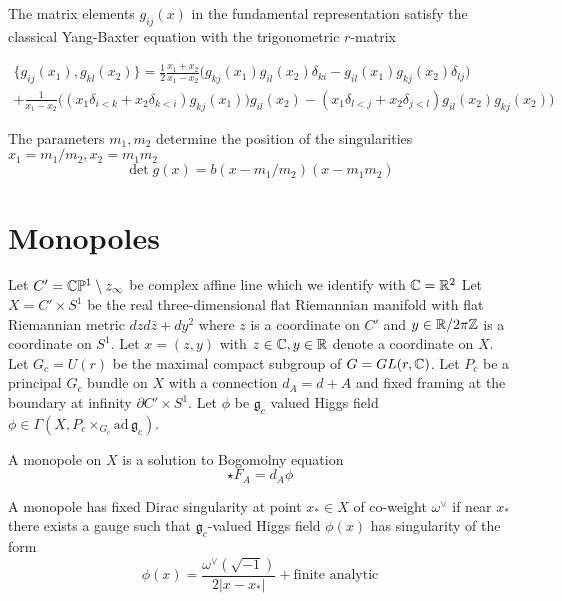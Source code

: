 \documentclass[12pt,psamsfonts,reqno]{amsart}
\begin{document}
The matrix elements $g_{ij}(x)$ in the fundamental representation satisfy the classical Yang-Baxter equation with the trigonometric $r$-matrix

\begin{multline}
  \{  g_{ij}(x_1), g_{kl}(x_2) \} = \frac{1}{2} \frac{ x_1 + x_2}{x_1 - x_2}
  \Big(  g_{kj}(x_1) g_{il}(x_2) \delta_{ki} - g_{il}(x_1) g_{kj}(x_2) \delta_{lj} \Big) \\
  + \frac{1}{x_1 -x_2} 
\Big ( (x_1 \delta_{i<k} + x_2 \delta_{k<i}) g_{kj}(x_1)) g_{il}(x_2)
 -(x_1 \delta_{l<j} + x_2 \delta_{j<l}) g_{il}(x_2) g_{kj}(x_2) \Big) 
\end{multline}

The parameters $m_1, m_2$ determine the position of the singularities $x_1 = m_1/m_2, x_2 = m_1 m_2$ 
\begin{equation}
  \det g(x) = b( x- m_1/m_2)(x - m_1 m_2) 
\end{equation}




\section{Monopoles}


 Let $C' = \mathbb C \mathbb P^1 \setminus z_{\infty}$ be complex affine line which
  we identify with $\mathbb C = \mathbb R^2$
 Let $X  = C' \times S^1$
  be the real three-dimensional  flat Riemannian manifold  with flat Riemannian metric $ dz d \bar z + dy^2$ where $z$ is a coordinate
  on $C'$ and $y \in \mathbb R/ 2 \pi \mathbb Z$ is a coordinate on $S^1$. Let $x = (z, y)$ with $z \in \mathbb C, y \in \mathbb R$
  denote a coordinate on $X$. 
 Let $G_c = U(r)$ be the maximal compact subgroup
  of $G =GL(r, \mathbb C)$. Let $P_c$ be a principal $G_c$ bundle on $X$ with a connection $d_{A} = d + A$
  and fixed framing at the boundary at infinity $ \partial C' \times S^1$. 
  Let $\phi$ be $\mathfrak{g}_{c}$  valued Higgs field $\phi \in \Gamma(X, P_c \times_{G_c} \mathrm{ad}\, \mathfrak{g}_c)
$. 

\begin{definition}
A monopole on $X$ is a solution to Bogomolny equation
  \begin{equation}
    \star F_{A} = d_{A} \phi
  \end{equation}
\end{definition}


\begin{definition}
A monopole has fixed Dirac singularity at point $x_{*} \in X$ of co-weight $\omega^{\vee}$
  if near $x_*$ there exists a gauge such that $\mathfrak{g}_{c}$-valued Higgs field $\phi(x)$ has singularity
of the form
\begin{equation}
  \phi(x) = \frac{ \omega^{\vee} (\sqrt{-1})} { 2 |x - x_{*}|} + \text{finite analytic}
\end{equation}
\end{definition}
\end{document}
